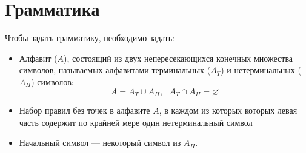 \documentclass[12pt,a4paper,oneside]{article}
\begin{document}
%
%
%
%
%
%
%
\section{Грамматика}

\begin{definition}
Чтобы задать грамматику, необходимо задать:
\begin{itemize}
\item Алфавит ($A$), состоящий из двух непересекающихся конечных 
множества символов, называемых 
алфавитами терминальных ($A_T$) и нетерминальных ($A_H$) символов:
$$A = A_T \cup A_H, ~~~ A_T \cap A_H = \varnothing$$
\item Набор правил без точек в алфавите $A$, в каждом из которых которых левая часть 
содержит по крайней мере один нетерминальный символ
\item Начальный символ --- некоторый символ из $A_H$.
\end{itemize}
\end{definition} 
\end{document}
